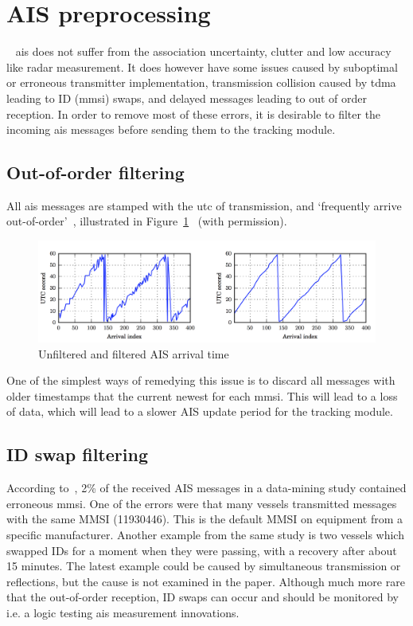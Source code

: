 \section{AIS preprocessing}~\label{sec:ais_preprocessing}
\Gls{ais} does not suffer from the association uncertainty, clutter and low accuracy like radar measurement. It does however have some issues caused by suboptimal or erroneous transmitter implementation, transmission collision caused by \gls{tdma} leading to ID (\gls{mmsi}) swaps, and delayed messages leading to out of order reception. In order to remove most of these errors, it is desirable to filter the incoming \gls{ais} messages before sending them to the tracking module.

\subsection{Out-of-order filtering}
All \gls{ais} messages are stamped with the \gls{utc} of transmission, and `frequently arrive out-of-order'~\cite{Wilthil}, illustrated in Figure~\ref{fig:out_of_order_ais}~\cite{Wilthil} (with permission).
\begin{figure}[H]
\centering
\includegraphics[width = .9\textwidth]{Figures/out_of_order_ais.png}
\caption{Unfiltered and filtered AIS arrival time}\label{fig:out_of_order_ais}
\end{figure}
One of the simplest ways of remedying this issue is to discard all messages with older timestamps that the current newest for each \gls{mmsi}. This will lead to a loss of data, which will lead to a slower AIS update period for the tracking module.

\subsection{ID swap filtering}
According to~\cite{Harati-Mokhtari2007}, 2\% of the received AIS messages in a data-mining study contained erroneous \gls{mmsi}. One of the errors were that many vessels transmitted messages with the same MMSI (11930446). This is the default MMSI on equipment from a specific manufacturer. Another example from the same study is two vessels which swapped IDs for a moment when they were passing, with a recovery after about 15 minutes. The latest example could be caused by simultaneous transmission or reflections, but the cause is not examined in the paper. Although much more rare that the out-of-order reception, ID swaps can occur and should be monitored by i.e. a logic testing \gls{ais} measurement innovations.

